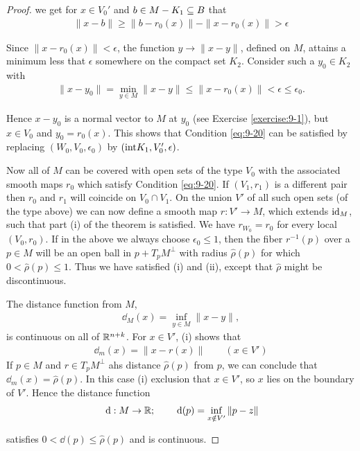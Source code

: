\begin{proof}
we get for $x\in V_0'$ and $b\in M-K_1\subseteq B$ that 
\begin{align*}
  \|x-b\|\ge \|b-r_0(x)\| - \|x-r_0(x)\| > \epsilon
\end{align*}

Since $\|x-r_0(x)\|<\epsilon$, the function $y\to\|x-y\|$, defined on $M$, attains a minimum less that 
$\epsilon$ somewhere on the compact set $K_2$. Consider such a $y_0\in K_2$ with 
\begin{align*}
  \|x-y_0\| = \min_{y\in M}\|x-y\| \le \|x-r_0(x)\| < \epsilon \le \epsilon_0.
\end{align*}

Hence $x-y_0$ is a normal vector to $M$ at $y_0$ (see Exercise \ref{exercise:9-1}), but $x\in V_0$
and $y_0=r_0(x)$. This shows that Condition \ref{eq:9-20} can be satisfied by replacing $(W_0, V_0, \epsilon_0)$
by $(\mathrm{int}K_1, V_0', \epsilon)$.

Now all of $M$ can be covered with open sets of the type $V_0$ with the associated
smooth maps $r_0$ which satisfy Condition \eqref{eq:9-20}. If $(V_1, r_1)$ is a different 
pair then $r_0$ and $r_1$ will coincide on $V_0\cap V_1$. On the union $V'$ of all such open 
sets (of the type above) we can now define a smooth map $r:V'\to M$, which extends $\operatorname{id}_M$, such
that part (i) of the theorem is satisfied. We have $r_{W_0} = r_0$ for every local $(V_0, r_0)$.
If in the above we always choose $\epsilon_0\le 1$, then the fiber $r^{-1}(p)$ over a $p\in M$ will
be an open ball in $p+T_pM^\perp$ with radius $\hat{\rho}(p)$ for which $0 < \hat{\rho}(p)\le 1$. Thus
we have satisfied (i) and (ii), except that $\hat{\rho}$ might be discontinuous.

The distance function from $M$,
\begin{align*}
  \dd_M(x) = \inf_{y\in M}\|x-y\|,
\end{align*}
is continuous on all of ${\mathbb{R}}^{n+k}$. For $x\in V'$, (i) shows that 
\begin{align*}
  \dd_m(x) = \|x-r(x)\|\qquad (x\in V')
\end{align*}
If $p\in M$ and $r\in T_pM^\perp$ ahs distance $\hat{\rho}(p)$ from $p$, we can conclude that 
$\dd_m(x) = \hat{\rho}(p)$. In this case (i) exclusion that $x\in V'$, so $x$ lies on the boundary 
of $V'$. Hence the distance function 
\begin{align*}
  \dd:M\to \RR;\qquad \dd(p) = \inf_{x\notin V'}\|p-z\|
\end{align*}

satisfies $0<\dd(p)\le \hat{\rho}(p)$ and is continuous.


\end{proof}
